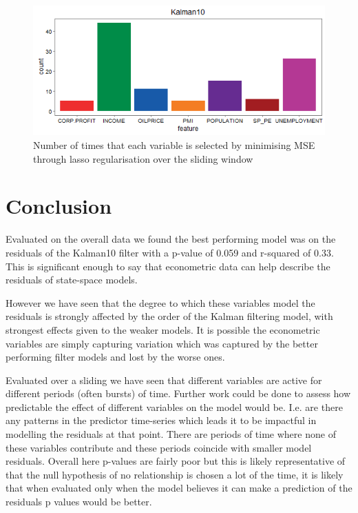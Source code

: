 \documentclass{sig-alternate-05-2015}
\begin{document}
\begin{figure}[b]
	\includegraphics[width=\linewidth]{count_Kalman10.png}
	\centering
	\caption{Number of times that each variable is selected by minimising MSE through lasso regularisation over the sliding window}
			\label{fig:counts}
\end{figure}






\section{Conclusion}
Evaluated on the overall data we found the best performing model was on the residuals of the Kalman10 filter with a p-value of 0.059 and r-squared of 0.33. This is significant enough to say that econometric data can help describe the residuals of state-space models.

However we have seen that the degree to which these variables model the residuals is strongly affected by the order of the Kalman filtering model, with strongest effects given to the weaker models. It is possible the econometric variables are simply capturing variation which was captured by the better performing filter models and lost by the worse ones.  

Evaluated over a sliding we have seen that different variables are active for different periods (often bursts) of time. Further work could be done to assess how predictable the effect of different variables on the model would be. I.e. are there any patterns in the predictor time-series which leads it to be impactful in modelling the residuals at that point. There are periods of time where none of these variables contribute and these periods coincide with smaller model residuals. Overall here p-values are fairly poor but this is likely representative of that the null hypothesis of no relationship is chosen a lot of the time, it is likely that when evaluated only when the model believes it can make a prediction of the residuals p values would be better.  
 
\end{document}
